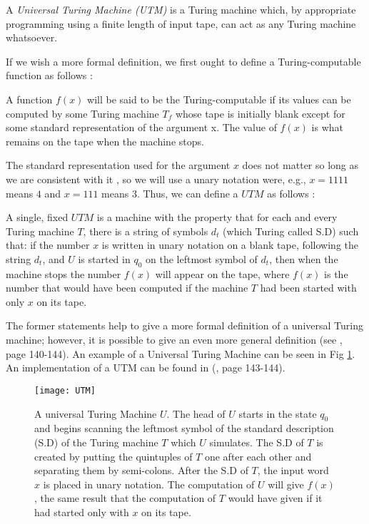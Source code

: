 \begin{defn}
A \textit{Universal Turing Machine (UTM)} is a Turing machine which, by appropriate programming using a finite length of input tape, can act as any Turing machine whatsoever. 
\end{defn}

If we wish a more formal definition, we first ought to define a Turing-computable function as follows \cite{marvin}:

\begin{defn}
A function $f(x)$ will be said to be the Turing-computable if its values can be computed by some Turing machine $T_{f}$ whose tape is initially blank except for some standard representation of the argument x. The value of $f(x)$ is what remains on the tape when the machine stops.
\end{defn}

The standard representation used for the argument $x$ does not matter so long as we are consistent with it \cite{marvin}, so we will use a unary notation were, e.g., $x=1111$ means $4$ and $x=111$ means $3$. Thus, we can define a $UTM$ as follows \cite{marvin}:

\begin{defn}
A single, fixed $UTM$ is a machine with the property that for each and every Turing machine $T$, there is a string of symbols $d_{t}$ (which Turing called S.D) such that: if the number $x$ is written in unary notation on a blank tape, following the string $d_{t}$, and $U$ is started in $q_{0}$ on the leftmost symbol of $d_{t}$, then when the machine stops the number $f(x)$ will appear on the tape, where $f(x)$ is the number that would have been computed if the machine $T$ had been started with only $x$ on its tape.
\end{defn}

The former statements help to give a more formal definition of a universal Turing machine; however, it is possible to give an even more general definition (see \cite{taylor}, page 140-144). An example of a Universal Turing Machine can be seen in Fig \ref{fig:UTM}. An implementation of a UTM can be found in (\cite{marvin}, page 143-144).

\begin{figure}
	\centering
		\texttt{[image: UTM]}
	\caption[A universal Turing Machine.]{A universal Turing Machine $U$. The head of $U$ starts in the state $q_{0}$ and begins scanning the leftmost symbol of the standard description (S.D) of the Turing machine $T$ which $U$ simulates. The S.D of $T$ is created by putting the quintuples of $T$ one after each other and separating them by semi-colons. After the S.D of $T$, the input word $x$ is placed in unary notation. The computation of $U$ will give $f(x)$, the same result that the computation of $T$ would have given if it had started only with $x$ on its tape.}
	\label{fig:UTM}
\end{figure}

